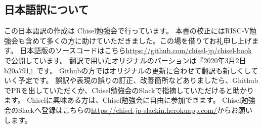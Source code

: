 \documentclass[%
    10pt,
    headinclude, footexclude,
    openright, %
    notitlepage,
    cleardoubleempty,
    headsepline,
    pointlessnumbers,
    bibtotoc, idxtotoc,
    ]{scrbook}
\newif\ifshoworiginal
\newif\ifshowtrans
\begin{document}
\begin{flushleft}
\ifshoworiginal
\section*{Acknowledgements}
\fi
\ifshowtrans %
\section*{謝辞}
\fi

\ifshoworiginal
I want to thank everyone who has worked on Chisel for creating such
a cool hardware construction language. Chisel is so joyful to use and
therefore worth writing a book about.
I am thankful to the whole Chisel community, which is so welcoming and friendly
and never tired to answer questions on Chisel.
\fi

\ifshowtrans %
クールなハードウェア構築言語であるChiselの開発に携わったすべてのみなさまに感謝します。
Chiselは使用するのがとても楽しく、その本を書く価値があります。
とてもオープンでフレンドリで、Chiselに関する質問に熱心に答えてくれる Chiselコミュニティ全体に感謝しています。
\fi

\ifshoworiginal
I would also like to thank my students in the last years of an advanced computer
architecture course where most of them picked up Chisel for the final project.
Thank you for moving out of your comfort zone and taking up the journey of
learning and using a bleeding-edge hardware description language.
Many of your questions have helped to shape this book.
\fi

\ifshowtrans %
また、最後の数年間、先進コンピュータアーキテクチャコースを受講した学生たちに感謝したいと思います。
ほとんどの生徒が最終プロジェクトのためにChiselを取り上げてくれました。
殻から抜け出し、新しい勉強の旅に出て、最先端のハードウェア記述言語を使用していただき感謝します。
あなたたちの質問の多くは、この本を形作るのに大変役立ちました。
\fi

\ifshowtrans %
\clearpage
\section*{日本語訳について}

この日本語訳の作成は Chisel勉強会で行っています。
本書の校正にはRISC-V勉強会も含めて多くの方に助けていただきました。この場を借りてお礼申し上げます。
日本語版のソースコードはこちら\url{https://github.com/chisel-jp/chisel-book} で公開しています。
翻訳で用いたオリジナルのバーションは『2020年3月2日 b20a791』です。
Githubの方ではオリジナルの更新に合わせて翻訳も新しくしていく予定です。
誤訳や表現の誤りの訂正、改善箇所などありましたら、GhithubでPRを出していただくか、Chisel勉強会のSlackで指摘していただけると助かります。
Chiselに興味ある方は、Chisel勉強会に自由に参加できます。
Chisel勉強会のSlackへ登録はこちらの\url{https://chisel-jp-slackin.herokuapp.com/}からお願いします。


\end{flushleft}
\end{document}
